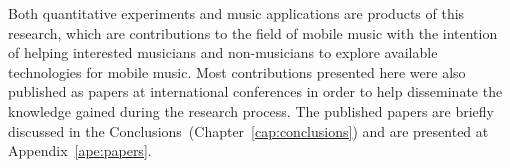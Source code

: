 Both quantitative experiments and music applications are products of this research, which are contributions to the field of mobile music with the intention of helping interested musicians and non-musicians to explore available technologies for mobile music.
Most contributions presented here were also published as papers at international conferences in order to help disseminate the knowledge gained during the research process.
The published papers are briefly discussed in the Conclusions~(Chapter~\ref{cap:conclusions}) and are presented at Appendix~\ref{ape:papers}.